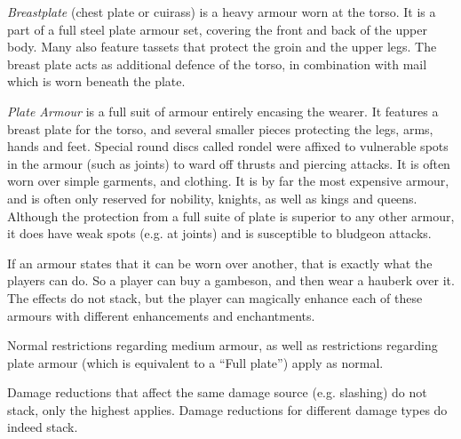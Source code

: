 \emph{Breastplate} (chest plate or cuirass) is a heavy armour worn at the
torso. It is a part of a full steel plate armour set, covering the front and
back of the upper body. Many also feature tassets that protect the groin and
the upper legs. The breast plate acts as additional defence of the torso,
in combination with mail which is worn beneath the plate.

\emph{Plate Armour} is a full suit of armour entirely encasing the wearer. It
features a breast plate for the torso, and several smaller pieces protecting
the legs, arms, hands and feet. Special round discs called rondel were affixed
to vulnerable spots in the armour (such as joints) to ward off thrusts and
piercing attacks. It is often worn over simple garments, and clothing. It is
by far the most expensive armour, and is often only reserved for nobility,
knights, as well as kings and queens. Although the protection from a full suite
of plate is superior to any other armour, it does have weak spots (e.g. at
joints) and is susceptible to bludgeon attacks.

\begin{note}
  If an armour states that it can be worn over another, that is exactly what
  the players can do. So a player can buy a gambeson, and then wear a hauberk
  over it. The effects do not stack, but the player can magically enhance each
  of these armours with different enhancements and enchantments.

  Normal restrictions regarding medium armour, as well as restrictions regarding
  plate armour (which is equivalent to a ``Full plate'') apply as normal.

  Damage reductions that affect the same damage source (e.g. slashing) do not
  stack, only the highest applies. Damage reductions for different damage types
  do indeed stack.
\end{note}
